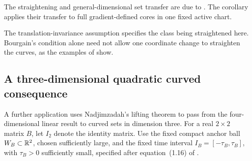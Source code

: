 The straightening and general-dimensional set transfer are due to
\citet[Theorem~1.12 and Section~4.2]{GaoLiuXi2025}. The corollary applies
their transfer to full gradient-defined cores in one fixed active
chart.

The translation-invariance assumption specifies the class being
straightened here. Bourgain's condition alone need not allow one coordinate change to
straighten the curves, as the examples of
\citet[Example~1.24 and Proposition~1.25]{NadjimzadahBourgain} show.

\subsection{A three-dimensional quadratic curved consequence}

A further application uses Nadjimzadah's lifting theorem to pass
from the four-dimensional linear result to curved sets in dimension
three. For a real \(2\times2\) matrix \(B\), let \(I_2\) denote the
identity matrix. Use the fixed compact anchor ball
\(W_B\subset\mathbb R^2\), chosen sufficiently large, and the fixed time
interval \(I_B=[-\tau_B,\tau_B]\), with \(\tau_B>0\) sufficiently
small, specified after equation~(1.16) of
\citet{NadjimzadahLifting}.

